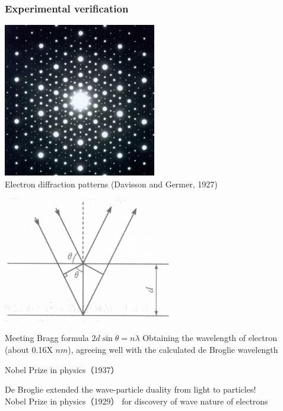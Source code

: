 \begin{frame}   
  \frametitle{Experimental verification}
  \begin{center}
    \includegraphics[width=0.5\textwidth]{figs/elediffr.jpeg} \\
    Electron diffraction patterns (Davisson and Germer, 1927)
    \end{center} 
\end{frame}
\begin{frame}   
    \begin{center}
      \includegraphics[width=0.55\textwidth]{figs/scatting.png} \\
    \end{center} 
    \begin{itemize}
        \Item  Meeting Bragg formula $2d\sin \theta=n\lambda $
        \Item  Obtaining the wavelength of electron (about 0.16X $nm$), agreeing well with the 
   calculated de Broglie wavelength 
    \end{itemize}
  {\color{deepred} Nobel Prize in physics（1937）}  
  \end{frame}

\begin{frame} 
    \begin{tcolorbox}[colback=yellow!10,colframe=red!75!black,title=Significance]
        De Broglie extended the wave-particle duality from light to particles! \\
        {\color{deepred} Nobel Prize in physics（1929）} for discovery of wave nature of electrons
    \end{tcolorbox}  
\end{frame}

